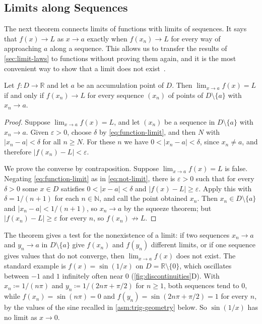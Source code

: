 \subsection{Limits along Sequences}

The next theorem connects limits of functions with limits of sequences. It says that $f(x)\to L$ as $x\to a$ exactly when $f(x_n)\to L$ for every way of approaching $a$ along a sequence. This allows us to transfer the results of \cref{sec:limit-laws} to functions without proving them again, and it is the most convenient way to show that a limit does not exist~\cite{abbott2015}.

\begin{theorem}
\label{thm:sequential-limit}
Let $f\colon D\to\mathbb R$ and let $a$ be an accumulation point of $D$. Then $\lim_{x\to a}f(x)=L$ if and only if $f(x_n)\to L$ for every sequence $(x_n)$ of points of $D\setminus\{a\}$ with $x_n\to a$.
\end{theorem}

\begin{proof}
Suppose $\lim_{x\to a}f(x)=L$, and let $(x_n)$ be a sequence in $D\setminus\{a\}$ with $x_n\to a$. Given $\varepsilon>0$, choose $\delta$ by \eqref{eq:function-limit}, and then $N$ with $|x_n-a|<\delta$ for all $n\ge N$. For these $n$ we have $0<|x_n-a|<\delta$, since $x_n\ne a$, and therefore $|f(x_n)-L|<\varepsilon$.

We prove the converse by contraposition. Suppose $\lim_{x\to a}f(x)=L$ is false. Negating \eqref{eq:function-limit} as in \eqref{eq:not-limit}, there is $\varepsilon>0$ such that for every $\delta>0$ some $x\in D$ satisfies $0<|x-a|<\delta$ and $|f(x)-L|\ge\varepsilon$. Apply this with $\delta=1/(n+1)$ for each $n\in\mathbb N$, and call the point obtained $x_n$. Then $x_n\in D\setminus\{a\}$ and $|x_n-a|<1/(n+1)$, so $x_n\to a$ by the squeeze theorem; but $|f(x_n)-L|\ge\varepsilon$ for every $n$, so $f(x_n)\not\to L$.
\end{proof}

The theorem gives a test for the nonexistence of a limit: if two sequences $x_n\to a$ and $y_n\to a$ in $D\setminus\{a\}$ give $f(x_n)$ and $f(y_n)$ different limits, or if one sequence gives values that do not converge, then $\lim_{x\to a}f(x)$ does not exist. The standard example is $f(x)=\sin(1/x)$ on $D=\mathbb R\setminus\{0\}$, which oscillates between $-1$ and $1$ infinitely often near $0$ (\cref{fig:discontinuities}D). With $x_n\coloneqq1/(n\pi)$ and $y_n\coloneqq1/(2n\pi+\pi/2)$ for $n\ge1$, both sequences tend to $0$, while $f(x_n)=\sin(n\pi)=0$ and $f(y_n)=\sin(2n\pi+\pi/2)=1$ for every $n$, by the values of the sine recalled in \cref{asm:trig-geometry} below. So $\sin(1/x)$ has no limit as $x\to0$.

